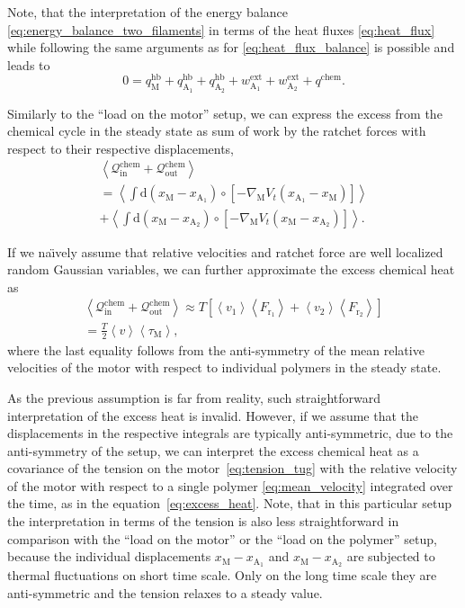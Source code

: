 \documentclass[aps,pre,twocolumn,showpacs,showkeys,superscriptaddress,floatfix]{revtex4-1}
\newcommand{\rmd}{{\mathrm d}}
\begin{document}
Note, that the interpretation of the energy balance \eqref{eq:energy_balance_two_filaments} in terms of the heat fluxes \eqref{eq:heat_flux}
while following the same arguments as for \eqref{eq:heat_flux_balance} is possible and leads to   
\[
0 = q_\text{M}^\text{hb} + q_{\text{A}_1}^\text{hb} + q_{\text{A}_2}^\text{hb} + w^\text{ext}_{\text{A}_1} + w^\text{ext}_{\text{A}_2} + q^\text{chem} .
\]

Similarly to the ``load on the motor'' setup, we can express the excess from the chemical cycle in the steady state as sum of work by the ratchet forces with respect to their respective displacements,
\begin{multline}
\left\langle 
{\mathcal Q}_\text{in}^\text{chem} + {\mathcal Q}_\text{out}^\text{chem} 
\right\rangle 
\\
= 
\left\langle 
\int \rmd \left( x_\text{M} - x_{\text{A}_1} \right) \circ \left[ - \nabla_\text{M} V_t( x_{\text{A}_1} - x_\text{M} ) \right]
\right\rangle 
\\
+
\left\langle 
\int \rmd \left( x_\text{M} - x_{\text{A}_2} \right) \circ \left[ - \nabla_\text{M} V_t( x_\text{M} - x_{\text{A}_2} ) \right]
\right\rangle .
\label{eq:excess_heat_tug}
\end{multline}
 
If we na\"{\i}vely assume that relative velocities and ratchet force are well localized random Gaussian variables, 
we can further approximate the excess chemical heat as 
\begin{multline*}
\left\langle 
{\mathcal Q}_\text{in}^\text{chem} + {\mathcal Q}_\text{out}^\text{chem} 
\right\rangle 
\approx T \left[ 
\left\langle v_1 \right\rangle \left\langle F_{\text{r}_1} \right\rangle  
+
\left\langle v_2 \right\rangle \left\langle F_{\text{r}_2} \right\rangle  
\right]
\\
= \frac{T}{2} \left\langle v \right\rangle \left\langle \tau_\text{M} \right\rangle
, 
\end{multline*}
where the last equality follows from the anti-symmetry of the mean relative velocities of the motor with respect to individual polymers in the steady state. 

As the previous assumption is far from reality, such straightforward interpretation of the excess heat is invalid. 
However, if we assume that the displacements in the respective integrals are typically anti-symmetric, due to the anti-symmetry of the setup, 
we can interpret the excess chemical heat as a covariance of the tension on the motor~\eqref{eq:tension_tug} with the relative velocity of the motor with respect to a single polymer \eqref{eq:mean_velocity} integrated over the time, 
as in the equation~\eqref{eq:excess_heat}. 
Note, that in this particular setup the interpretation in terms of the tension is also less straightforward in comparison with the ``load on the motor'' or the ``load on the polymer'' setup, 
because the individual displacements $x_\text{M} - x_{\text{A}_1}$ and $x_\text{M} - x_{\text{A}_2}$ are subjected to thermal fluctuations on short time scale. 
Only on the long time scale they are anti-symmetric and the tension relaxes to a steady value.  
\end{document}
